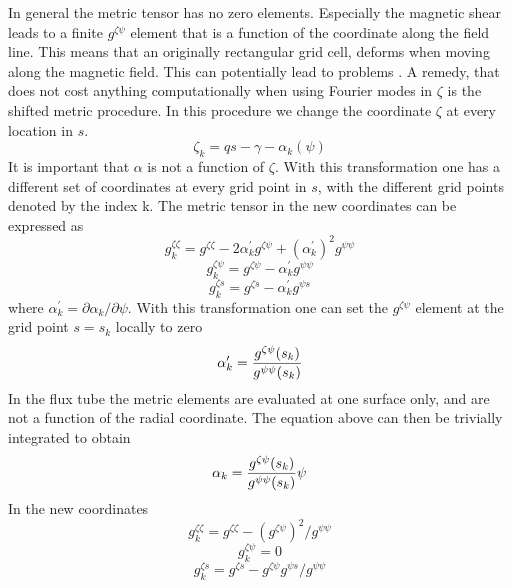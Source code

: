 In general the metric tensor has no zero elements. Especially the magnetic shear leads to a finite $g^{\zeta \psi}$ element that is 
a function of the coordinate along the field line. This means that an originally rectangular grid cell, deforms when moving along the 
magnetic field. This can potentially lead to problems \cite{SCO01}. A remedy, that does not cost anything computationally when using 
Fourier modes in $\zeta$ is the shifted metric procedure. In this procedure we change the coordinate $\zeta$ at every location in 
$s$. 
\begin{equation} 
\zeta_k = q s - \gamma - \alpha_k(\psi)
\end{equation}
It is important that $\alpha$ is not a function of $\zeta$. With this transformation one has a different set of coordinates at 
every grid point in $s$, with the different grid points denoted by the index k. 
The metric tensor in the new coordinates can be expressed as 
\begin{equation} 
g_k^{\zeta \zeta} = g^{\zeta \zeta} - 2 \alpha_k^\prime g^{\zeta \psi} + (\alpha_k^\prime)^2 g^{\psi \psi}
\end{equation}
\begin{equation} 
g_k^{\zeta \psi} = g^{\zeta \psi} - \alpha_k^\prime g^{\psi \psi}
\end{equation}
\begin{equation}
g_k^{\zeta s} = g^{\zeta s} - \alpha_k^\prime g^{\psi s} 
\end{equation}
where $\alpha_k^\prime = {\partial \alpha_k / \partial \psi}$. With this transformation one can 
set the $g^{\zeta \psi}$ element at the grid point $s = s_k$ locally to zero 
\begin{equation} 
\alpha_k^\prime = {g^{\zeta \psi}(s_k) \over g^{\psi \psi}(s_k)}
\end{equation}
In the flux tube the metric elements are evaluated at one surface only, and are not a function of 
the radial coordinate. The equation above can then be trivially integrated to obtain 
\begin{equation} 
\alpha_k = {g^{\zeta \psi}(s_k) \over g^{\psi \psi}(s_k)} \psi 
\end{equation}
In the new coordinates 
\begin{equation}  
g_k^{\zeta \zeta} = g^{\zeta \zeta} -  (g^{\zeta \psi})^2 / g^{\psi \psi}
\end{equation}
\begin{equation} 
g_k^{\zeta \psi} = 0
\end{equation}
\begin{equation} 
g_k^{\zeta s} = g^{\zeta s} - g^{\zeta \psi} g^{\psi s} / g^{\psi \psi} 
\end{equation}

